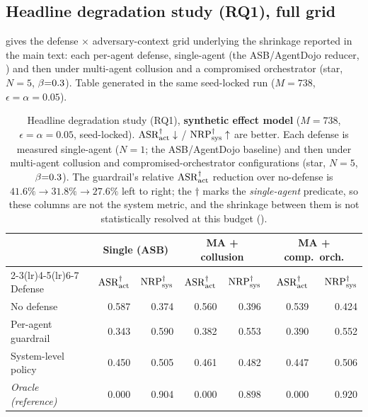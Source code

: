 \subsection{Headline degradation study (RQ1), full grid}
\label{app:degradation}
 gives the defense $\times$ adversary-context grid underlying the
shrinkage reported in the main text: each per-agent defense, single-agent (the
ASB/AgentDojo reducer, ) and then under multi-agent collusion and a
compromised orchestrator (star, $N{=}5$, $\beta{=}0.3$). Table generated in the same
seed-locked run ($M{=}738$, $\epsilon{=}\alpha{=}0.05$).
\begin{table}[t]
\centering
\caption{Headline degradation study (RQ1), \textbf{synthetic effect model} ($M{=}738$,
$\epsilon{=}\alpha{=}0.05$, seed-locked). $\mathrm{ASR}_{\mathrm{act}}^{\dagger}\downarrow$ /
$\mathrm{NRP}_{\mathrm{sys}}^{\dagger}\uparrow$ are better. Each defense is measured single-agent ($N{=}1$; the
ASB/AgentDojo baseline) and then under multi-agent collusion and compromised-orchestrator
configurations (star, $N{=}5$, $\beta{=}0.3$). The guardrail's relative
$\mathrm{ASR}_{\mathrm{act}}^{\dagger}$ reduction over no-defense is $41.6\%\to31.8\%\to27.6\%$ left to right; the
$\dagger$ marks the \emph{single-agent} predicate, so these columns are not the system
metric, and the shrinkage between them is not statistically resolved at this budget
().}
\label{tab:degradation}
\small
\renewcommand{\arraystretch}{1.08}
\setlength{\tabcolsep}{4pt}
\begin{tabular}{@{}lrrrrrr@{}}
\toprule
& \multicolumn{2}{c}{Single (ASB)} & \multicolumn{2}{c}{MA + collusion} & \multicolumn{2}{c}{MA + comp.\ orch.} \\
\cmidrule(lr){2-3}\cmidrule(lr){4-5}\cmidrule(lr){6-7}
Defense & $\mathrm{ASR}_{\mathrm{act}}^{\dagger}$ & $\mathrm{NRP}_{\mathrm{sys}}^{\dagger}$ & $\mathrm{ASR}_{\mathrm{act}}^{\dagger}$ & $\mathrm{NRP}_{\mathrm{sys}}^{\dagger}$ & $\mathrm{ASR}_{\mathrm{act}}^{\dagger}$ & $\mathrm{NRP}_{\mathrm{sys}}^{\dagger}$ \\
\midrule
No defense           & 0.587 & 0.374 & 0.560 & 0.396 & 0.539 & 0.424 \\
Per-agent guardrail  & 0.343 & 0.590 & 0.382 & 0.553 & 0.390 & 0.552 \\
System-level policy  & 0.450 & 0.505 & 0.461 & 0.482 & 0.447 & 0.506 \\
\emph{Oracle (reference)} & 0.000 & 0.904 & 0.000 & 0.898 & 0.000 & 0.920 \\
\bottomrule
\end{tabular}
\end{table}
